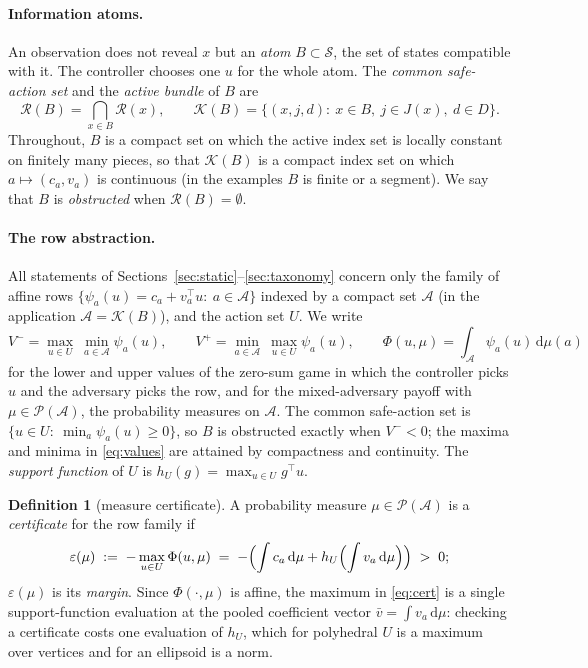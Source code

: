 \documentclass[11pt,a4paper]{article}
\theoremstyle{plain}
\theoremstyle{definition}
\newtheorem{definition}[theorem]{Definition}
\theoremstyle{remark}
\newcommand{\calA}{\mathcal{A}}
\newcommand{\calK}{\mathcal{K}}
\newcommand{\calP}{\mathcal{P}}
\newcommand{\calR}{\mathcal{R}}
\newcommand{\calS}{\mathcal{S}}
\newcommand{\dd}{\,\mathrm{d}}
\begin{document}
\paragraph{Information atoms.} An observation does not reveal $x$ but an \emph{atom} $B\subset\calS$, the set of states compatible with it. The controller chooses one $u$ for the whole atom. The \emph{common safe-action set} and the \emph{active bundle} of $B$ are
\begin{equation}\label{eq:common}
\calR(B)=\bigcap_{x\in B}\calR(x),\qquad \calK(B)=\{(x,j,d):\ x\in B,\ j\in J(x),\ d\in D\}.
\end{equation}
Throughout, $B$ is a compact set on which the active index set is locally constant on finitely many pieces, so that $\calK(B)$ is a compact index set on which $a\mapsto(c_a,v_a)$ is continuous (in the examples $B$ is finite or a segment). We say that $B$ is \emph{obstructed} when $\calR(B)=\emptyset$.

\paragraph{The row abstraction.} All statements of Sections~\ref{sec:static}--\ref{sec:taxonomy} concern only the family of affine rows $\{\psi_a(u)=c_a+v_a^\top u:\ a\in\calA\}$ indexed by a compact set $\calA$ (in the application $\calA=\calK(B)$), and the action set $U$. We write
\begin{equation}\label{eq:values}
V^-=\max_{u\in U}\ \min_{a\in\calA}\psi_a(u),\qquad V^+=\min_{a\in\calA}\ \max_{u\in U}\psi_a(u),\qquad
\Phi(u,\mu)=\int_{\calA}\psi_a(u)\dd\mu(a)
\end{equation}
for the lower and upper values of the zero-sum game in which the controller picks $u$ and the adversary picks the row, and for the mixed-adversary payoff with $\mu\in\calP(\calA)$, the probability measures on $\calA$. The common safe-action set is $\{u\in U:\ \min_a\psi_a(u)\ge0\}$, so $B$ is obstructed exactly when $V^-<0$; the maxima and minima in \eqref{eq:values} are attained by compactness and continuity. The \emph{support function} of $U$ is $h_U(g)=\max_{u\in U}g^\top u$.

\begin{definition}[measure certificate]\label{def:certificate}
A probability measure $\mu\in\calP(\calA)$ is a \emph{certificate} for the row family if
\begin{equation}\label{eq:cert}
\varepsilon(\mu)\;:=\;-\max_{u\in U}\Phi(u,\mu)\;=\;-\Bigl(\int c_a\dd\mu+h_U\Bigl(\int v_a\dd\mu\Bigr)\Bigr)\;>\;0 ;
\end{equation}
$\varepsilon(\mu)$ is its \emph{margin}. Since $\Phi(\cdot,\mu)$ is affine, the maximum in \eqref{eq:cert} is a single support-function evaluation at the pooled coefficient vector $\bar v=\int v_a\dd\mu$: checking a certificate costs one evaluation of $h_U$, which for polyhedral $U$ is a maximum over vertices and for an ellipsoid is a norm.
\end{definition}
\end{document}
